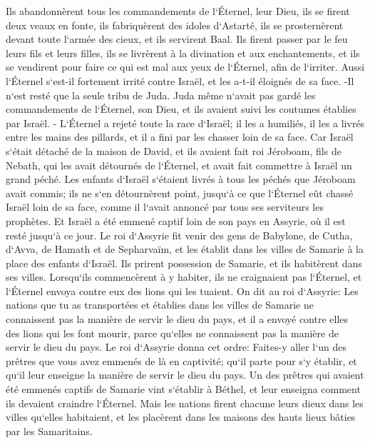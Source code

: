 \verse Ils abandonnèrent tous les commandements de l`Éternel, leur Dieu, ils se firent deux veaux en fonte, ils fabriquèrent des idoles d`Astarté, ils se prosternèrent devant toute l`armée des cieux, et ils servirent Baal. 
\verse Ils firent passer par le feu leurs fils et leurs filles, ils se livrèrent à la divination et aux enchantements, et ils se vendirent pour faire ce qui est mal aux yeux de l`Éternel, afin de l`irriter. 
\verse Aussi l`Éternel s`est-il fortement irrité contre Israël, et les a-t-il éloignés de sa face. -Il n`est resté que la seule tribu de Juda. 
\verse Juda même n`avait pas gardé les commandements de l`Éternel, son Dieu, et ils avaient suivi les coutumes établies par Israël. - 
\verse L`Éternel a rejeté toute la race d`Israël; il les a humiliés, il les a livrés entre les mains des pillards, et il a fini par les chasser loin de sa face. 
\verse Car Israël s`était détaché de la maison de David, et ils avaient fait roi Jéroboam, fils de Nebath, qui les avait détournés de l`Éternel, et avait fait commettre à Israël un grand péché. 
\verse Les enfants d`Israël s`étaient livrés à tous les péchés que Jéroboam avait commis; ils ne s`en détournèrent point, 
\verse jusqu`à ce que l`Éternel eût chassé Israël loin de sa face, comme il l`avait annoncé par tous ses serviteurs les prophètes. Et Israël a été emmené captif loin de son pays en Assyrie, où il est resté jusqu`à ce jour. 
\verse Le roi d`Assyrie fit venir des gens de Babylone, de Cutha, d`Avva, de Hamath et de Sepharvaïm, et les établit dans les villes de Samarie à la place des enfants d`Israël. Ils prirent possession de Samarie, et ils habitèrent dans ses villes. 
\verse Lorsqu`ils commencèrent à y habiter, ils ne craignaient pas l`Éternel, et l`Éternel envoya contre eux des lions qui les tuaient. 
\verse On dit au roi d`Assyrie: Les nations que tu as transportées et établies dans les villes de Samarie ne connaissent pas la manière de servir le dieu du pays, et il a envoyé contre elles des lions qui les font mourir, parce qu`elles ne connaissent pas la manière de servir le dieu du pays. 
\verse Le roi d`Assyrie donna cet ordre: Faites-y aller l`un des prêtres que vous avez emmenés de là en captivité; qu`il parte pour s`y établir, et qu`il leur enseigne la manière de servir le dieu du pays. 
\verse Un des prêtres qui avaient été emmenés captifs de Samarie vint s`établir à Béthel, et leur enseigna comment ils devaient craindre l`Éternel. 
\verse Mais les nations firent chacune leurs dieux dans les villes qu`elles habitaient, et les placèrent dans les maisons des hauts lieux bâties par les Samaritains. 
